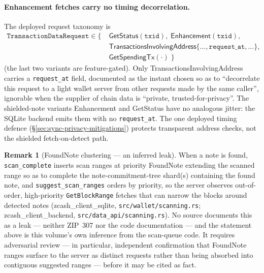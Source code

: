 \documentclass[11pt,a4paper]{article}
\theoremstyle{definition}
\newtheorem{remark}[theorem]{Remark}
\begin{document}
\paragraph{Enhancement fetches carry no timing decorrelation.} The deployed
request taxonomy is
\begin{align*}
\texttt{TransactionDataRequest} \in \{\;
  &\textsf{GetStatus}(\texttt{txid}),\;
   \textsf{Enhancement}(\texttt{txid}),\\
  &\textsf{TransactionsInvolvingAddress}\{\ldots,
   \texttt{request\_at}, \ldots\},\\
  &\textsf{GetSpendingTx}(\cdot)\;\}
\end{align*}
(the last two
variants are feature-gated). Only \textsf{TransactionsInvolvingAddress}
carries a \texttt{request\_at} field, documented as the instant chosen so
as to ``decorrelate this request to a light wallet server from other
requests made by the same caller'', ignorable when the supplier of chain
data is ``private, trusted-for-privacy''. The shielded-note variants
\textsf{Enhancement} and \textsf{GetStatus} have no analogous jitter: the
SQLite backend emits them with no \texttt{request\_at}. The one deployed
timing defence (\S\ref{sec:sync-privacy-mitigations}) protects transparent
address checks, not the shielded fetch-on-detect path.

\begin{remark}[FoundNote clustering --- an inferred leak]
\label{rem:sync-foundnote}
When a note is found, \texttt{scan\_complete} inserts scan ranges at
priority \textsf{FoundNote} extending the scanned range so as to complete
the note-commitment-tree shard(s) containing the found note, and
\texttt{suggest\_scan\_ranges} orders by priority, so the server observes
out-of-order, high-priority \texttt{GetBlockRange} fetches that can narrow
the blocks around detected notes
(\textsf{zcash\_client\_sqlite}, \texttt{src/wallet/scanning.rs};
\textsf{zcash\_client\_backend}, \texttt{src/data\_api/scanning.rs}). No
source documents this as a leak --- neither ZIP~307 nor the code
documentation --- and the statement above is this volume's own inference
from the scan-queue code. It requires adversarial review --- in
particular, independent confirmation that \textsf{FoundNote} ranges surface
to the server as distinct requests rather than being absorbed into
contiguous suggested ranges --- before it may be cited as fact.
\end{remark}
\end{document}
